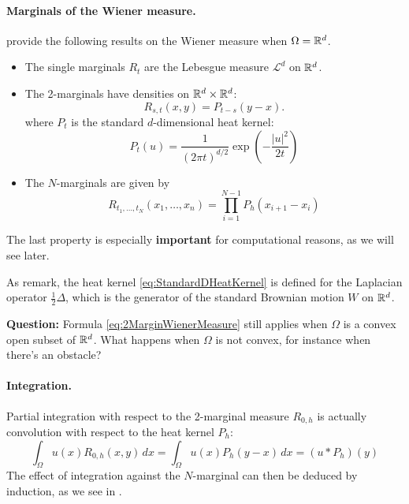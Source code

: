 \documentclass[../report.tex]{subfiles}
\begin{document}
\paragraph{Marginals of the Wiener measure.} \textcite{benamou2018entropy} provide the following results on the Wiener measure when $\Omega = \mathbb{R}^d$.
\begin{itemize}
	\item The single marginals $R_t$ are the Lebesgue measure $\mathcal{L}^d$ on $\mathbb{R}^d$.
	\item The 2-marginals have densities on $\mathbb{R}^d \times \mathbb{R}^d$:
	\begin{equation}\label{eq:2MarginWienerMeasure}
		R_{s,t}(x,y) = P_{t-s}(y-x).
	\end{equation}
	where $P_t$ is the standard $d$-dimensional heat kernel:
	\begin{equation}\label{eq:StandardDHeatKernel}
		P_t(u) =
		\frac{1}{(2\pi t)^{d/2}} \exp\left(
		-\frac{|u|^2}{2t}
		\right)
	\end{equation}
	\item The $N$-marginals are given by
	\begin{equation}
		R_{t_1,\ldots,t_N}(x_1,\ldots,x_n) = 
		\prod_{i=1}^{N-1}
		P_{h}(x_{i+1}-x_i)
	\end{equation}
\end{itemize}
The last property is especially \textbf{important} for computational reasons, as we will see later.

\begin{remark}
	As \textcite[p.~5]{benamou2018entropy} remark, the heat kernel \eqref{eq:StandardDHeatKernel} is defined for the Laplacian operator $\frac{1}{2}\Delta$, which is the generator of the standard Brownian motion $W$ on $\mathbb{R}^d$.
	
	\textbf{Question:} Formula \eqref{eq:2MarginWienerMeasure} still applies when $\Omega$ is a convex open subset of $\mathbb{R}^d$. What happens when $\Omega$ is not convex, for instance when there's an obstacle?
\end{remark}


\paragraph{Integration.} Partial integration with respect to the 2-marginal measure $R_{0,h}$ is actually convolution with respect to the heat kernel $P_h$:
\[
	\int_\Omega u(x) R_{0,h}(x,y)\,dx =
	\int_\Omega u(x) P_h(y-x)\,dx =
	(u * P_h)(y)
\]
The effect of integration against the $N$-marginal can then be deduced by induction, as we see in .
\end{document}
